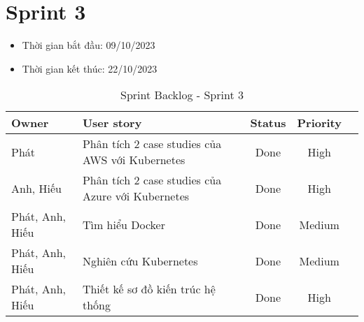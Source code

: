 \section{Sprint 3}
\begin{itemize}
    \item Thời gian bắt đầu: 09/10/2023
    \item Thời gian kết thúc: 22/10/2023
\end{itemize}
\begin{table}[H]
    \begin{tabular}{|m{2.5cm}|m{9cm}|c|c|c|}
    \hline
    \textbf{Owner}  & \textbf{User story}                                & \textbf{Status}  & \textbf{Priority} \\ \hline
    Phát                 & Phân tích 2 case studies của AWS với Kubernetes                       & Done                              & High           \\ \hline
    Anh, Hiếu                 & Phân tích 2 case studies của Azure với Kubernetes                       & Done                              & High           \\ \hline
    Phát, Anh, Hiếu                  & Tìm hiểu Docker                       & Done                              & Medium          \\ \hline
    Phát, Anh, Hiếu                 & Nghiên cứu Kubernetes                       & Done                              & Medium          \\ \hline
    Phát, Anh, Hiếu                 & Thiết kế sơ đồ kiến trúc hệ thống                       & Done                              & High           \\ \hline
    \end{tabular}
    \caption{Sprint Backlog - Sprint 3}
    \label{tab:sprint-3}
\end{table}
